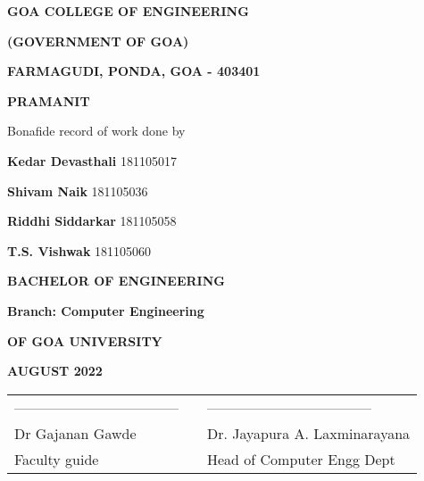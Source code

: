     \thispagestyle{empty}
    \begin{center}
        {\Large \textbf{GOA COLLEGE OF ENGINEERING} \par}
        {\textbf{(GOVERNMENT OF GOA)} \par}
        {\Large \textbf{FARMAGUDI, PONDA, GOA - 403401} \par}
    \vspace{.5cm}

    {\uppercase{\Huge \textbf{PRAMANIT\\}}}
\vspace{.5cm}

    {\large { Bonafide record of work done by} \par }
    \vspace{1cm}
        {\Large{ \textbf{ Kedar Devasthali } 181105017}\par }
        {\Large \textbf{ Shivam Naik }181105036 \par}
        {\Large \textbf{ Riddhi  Siddarkar }181105058 \par}
        {\Large \textbf{ T.S. Vishwak }181105060 \par}
        \vspace{0.5cm}
        
    \end{center}
        { \par }
        \begin{center}
            
        {\Large \textbf{BACHELOR OF ENGINEERING}\par}
        {\Large \textbf{Branch: Computer Engineering}\par}
        {\Large \textbf {OF GOA UNIVERSITY}\par}
        {\Large \textbf{AUGUST 2022}\par}
        \vspace{1.5cm}
        

    \end{center}
    \begin{table}[H]
        \begin{center}
    \begin{tabular}{lcl}
        \noindent ----------------------------------- &\hspace{1cm}&  ----------------------------------- \\
    Dr Gajanan Gawde & \hspace{3cm} & Dr. Jayapura A. Laxminarayana  \\
    Faculty guide        & \hspace{3cm} & Head of Computer Engg Dept    \\
    \end{tabular}
    \end{center}
\end{table}

